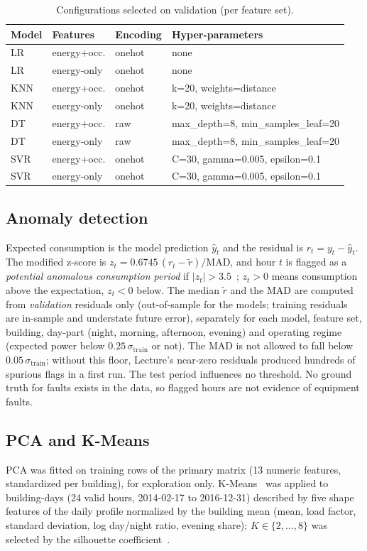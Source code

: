 \documentclass[conference]{IEEEtran}
\begin{document}
\begin{table}[t]
\caption{Configurations selected on validation (per feature set).}\label{tab:cfg}
\centering\small
\begin{tabular}{llll}
\toprule
Model & Features & Encoding & Hyper-parameters\\
\midrule
LR & energy+occ. & onehot & none \\
LR & energy-only & onehot & none \\
KNN & energy+occ. & onehot & k=20, weights=distance \\
KNN & energy-only & onehot & k=20, weights=distance \\
DT & energy+occ. & raw & max\_depth=8, min\_samples\_leaf=20 \\
DT & energy-only & raw & max\_depth=8, min\_samples\_leaf=20 \\
SVR & energy+occ. & onehot & C=30, gamma=0.005, epsilon=0.1 \\
SVR & energy-only & onehot & C=30, gamma=0.005, epsilon=0.1 \\

\bottomrule
\end{tabular}
\end{table}

\subsection{Anomaly detection}
Expected consumption is the model prediction $\hat y_t$ and the residual is $r_t=y_t-\hat y_t$. The modified z-score is
$z_t = 0.6745\,(r_t-\tilde r)/\mathrm{MAD}$, and hour $t$ is flagged as a \emph{potential anomalous consumption period} if $|z_t|>3.5$~\cite{iglewicz1993outliers}; $z_t>0$ means consumption above the expectation, $z_t<0$ below.
The median $\tilde r$ and the MAD are computed from \emph{validation} residuals only (out-of-sample for the models; training residuals are in-sample and understate future error), separately for each model, feature set, building,
day-part (night, morning, afternoon, evening) and operating regime (expected power below $0.25\,\sigma_{\mathrm{train}}$ or not). The MAD is not allowed to fall below $0.05\,\sigma_{\mathrm{train}}$; without this floor, Lecture's near-zero
residuals produced hundreds of spurious flags in a first run. The test period influences no threshold. No ground truth for faults exists in the data, so flagged hours are not evidence of equipment faults.

\subsection{PCA and K-Means}
PCA was fitted on training rows of the primary matrix (13 numeric features, standardized per building), for exploration only. K-Means~\cite{lloyd1982kmeans} was applied to building-days (24 valid hours, 2014-02-17 to 2016-12-31)
described by five shape features of the daily profile normalized by the building mean (mean, load factor, standard deviation, log day/night ratio, evening share); $K\in\{2,\dots,8\}$ was selected by the silhouette coefficient~\cite{rousseeuw1987silhouettes}.
\end{document}
